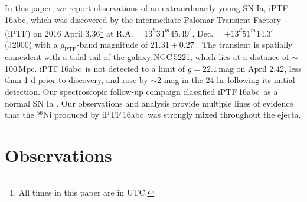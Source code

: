 \documentclass[twocolumn]{aastex61}
\newcommand{\abc}{iPTF\,16abc}
\begin{document}
In this paper, we report observations of an extraordinarily young SN
Ia, \abc, which was discovered by the intermediate Palomar
Transient Factory (iPTF) on 2016 April $3.36$\footnote{All times in this
  paper are in UTC.} at $\textrm{R.A.}=13^h34^m45.49^s$,
$\textrm{Dec.}=+13^d51^m14.3^s$ (J2000) with a $g_\mathrm{PTF}$-band magnitude of
$21.31\pm0.27$ \citep{2016ATel.8907....1M}. The
transient is spatially coincident with a tidal tail of the galaxy
NGC\,5221, which lies at a distance of $\sim$100\,Mpc. \abc\ is not detected to a limit of $g=22.1$\,mag on April $2.42$, less than 1 d prior to discovery, and rose by $\sim$2 mag in the 24 hr following its initial detection. Our spectroscopic follow-up
compaign classified \abc\ as a normal SN Ia
\citep{2016ATel.8909....1C}. Our observations and analysis provide multiple lines of evidence that the $^{56}$Ni produced by \abc\ was strongly mixed throughout the ejecta. 


\section{Observations}
\label{sec:obs}
\end{document}
